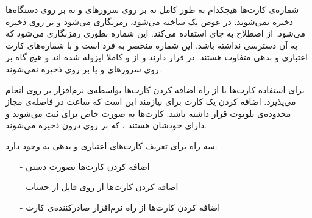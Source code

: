 \documentclass[oneside]{report}
\begin{document}
   شماره‌ی کارت‌ها هیچکدام به طور کامل نه بر روی سرور‌های 
      	{\normalsize {}} 
      	و نه بر روی دستگاه‌ها ذخیره نمی‌شوند. در عوض یک 
      	   	{\normalsize {}}
    ساخته می‌شود، رمزنگاری می‌شود و بر روی
       	{\normalsize {}}
       	ذخیره می‌شود. 
       	      	         	{\normalsize {}} 
       	      	         	از اصطلاح 
       	      	         	      	   	{\normalsize {}}
       	      	         	      	   	به جای 
       	      	      	{\normalsize {}}          	      	   	
       	      	   استفاده می‌کند.
       	این شماره بطوری رمزنگاری می‌شود که 
       	   	{\normalsize {}} به آن دسترسی نداشته باشد.
       	   	 این شماره منحصر به فرد است و با شماره‌های کارت اعتباری و بدهی متفاوت هستند. 
       	   	        	   	{\normalsize {}}
 در 
       	   	        	   	       	{\normalsize {}}
   قرار دارند و از 
          	{\normalsize {}}
          	و 
          	       	{\normalsize {}}
 کاملا ایزوله شده اند  و هیچ گاه بر روی سرورهای 
        	{\normalsize {}}
        	و یا بر روی 
        	       	{\normalsize {}}
        	       	ذخیره نمی‌شوند.        	        	    	   	        	   	 
        	       	
برای استفاده کارت‌ها با 
       	{\normalsize {}}
   از راه اضافه کردن کارت‌ها بواسطه‌ی نرم‌افزار 
          	{\normalsize {}}
          	بر روی 
          	       	{\normalsize \lr{iPhone]}}
انجام می‌پذیرد. اضافه کردن یک کارت برای 
       	{\normalsize {}} 
       	نیازمند این است که ساعت در فاصله‌ی مجاز محدوده‌ی بلوتوث قرار داشته باشد. کارت‌ها به صورت خاص برای 
       	       	{\normalsize {}} 
 ثبت می‌شوند و دارای 
          	   	        	   	{\normalsize {}}    	       	
       	خودشان هستند ، که بر روی 
       	{\normalsize {}}  
       	درون 
       	{\normalsize {}}
       	ذخیره می‌شوند.
       	
       	سه راه برای تعریف کارت‌های اعتباری و بدهی به 
       	{\normalsize {}}
       	وجود دارد: 
       \begin{itemize}
       	\item[-] اضافه کردن کارت‌ها بصورت دستی
       	\item[-] اضافه کردن کارت‌ها از روی فایل از حساب {\normalsize {}} 
       	\item[-] اضافه کردن کارت‌ها از راه نرم‌افزار صادرکننده‌ی کارت
       \end{itemize}
\end{document}
